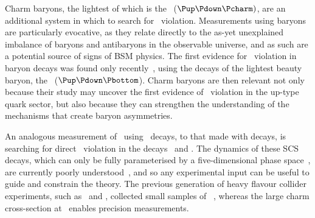 
Charm baryons, the lightest of which is the \PLambdac~($\Pup\Pdown\Pcharm)$, 
are an additional system in which to search for \CP\ violation.
Measurements using baryons are particularly evocative, as they relate directly 
to the as-yet unexplained imbalance of baryons and antibaryons in the 
observable universe, and as such are a potential source of signs of \ac{BSM} 
physics.
The first evidence for \CP\ violation in baryon decays was found only 
recently~\cite{Aaij:2016cla}, using the decays of the lightest beauty baryon, 
the \PLambdab~($\Pup\Pdown\Pbottom$).
Charm baryons are then relevant not only because their study may uncover the 
first evidence of \CP\ violation in the up-type quark sector, but also because 
they can strengthen the understanding of the mechanisms that create baryon 
asymmetries.

An analogous measurement of \dACP\ using \PLambdac\ decays, to that made with 
\PDzero decays, is searching for direct \CP\ violation in the decays \LcTopKK\ 
and \LcToppipi.
The dynamics of these \ac{SCS} decays, which can only be fully parameterised by 
a five-dimensional phase space~\cite{Aitala:1999uq}, are currently poorly 
understood~\cite{Bigi:2012ev,PDG2014}, and so any experimental input can be 
useful to guide and constrain the theory.
The previous generation of heavy flavour collider experiments, such as \belle\ 
and \babar, collected small samples of \PLambdac~\cite{Seuster:2005tr}, whereas 
the large charm cross-section at \lhcb\ enables precision measurements.

